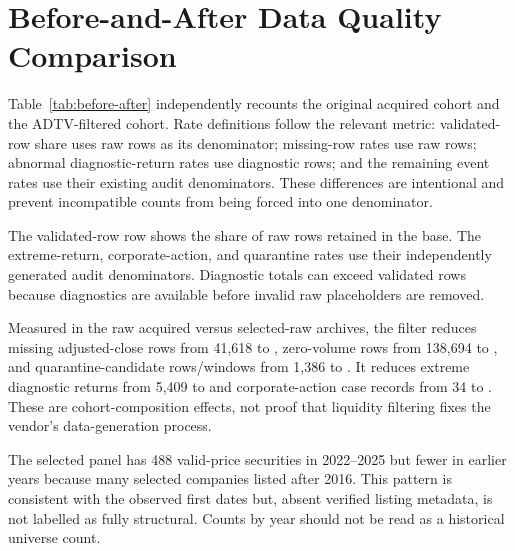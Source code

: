 \section{Before-and-After Data Quality Comparison}

Table~\ref{tab:before-after} independently recounts the original acquired
cohort and the ADTV-filtered cohort. Rate definitions follow the relevant
metric: validated-row share uses raw rows as its denominator; missing-row rates
use raw rows; abnormal diagnostic-return rates use diagnostic rows; and the
remaining event rates use their existing audit denominators. These differences
are intentional and prevent incompatible counts from being forced into one
denominator.

\begin{table}[H]
\centering
\caption{Before-and-after data-quality comparison}
\label{tab:before-after}
\scriptsize
{}
\begin{tablenotes}\small
\item The validated-row row shows the share of raw rows retained in the base.
The extreme-return, corporate-action, and quarantine rates use their
independently generated audit denominators. Diagnostic totals can exceed
validated rows because diagnostics are available before invalid raw
placeholders are removed.
\end{tablenotes}
\end{table}

Measured in the raw acquired versus selected-raw archives, the filter reduces
missing adjusted-close rows from 41,618 to \MissingAdjClose{}, zero-volume rows
from 138,694 to \ZeroVolumeRows{}, and
quarantine-candidate rows/windows from 1,386 to \QuarantineRowsWindows{}.
It reduces extreme diagnostic returns from 5,409 to \ExtremeReturns{} and
corporate-action case records from 34 to \CorporateActionCaseRecords{}.
These are cohort-composition effects, not proof that liquidity filtering fixes
the vendor's data-generation process.

\begin{table}[H]
\centering
\caption{Selected-cohort observations and missing values by year}
\label{tab:quality-year}
\small
{}
\end{table}

The selected panel has 488 valid-price securities in 2022--2025 but fewer in
earlier years because many selected companies listed after 2016. This pattern
is consistent with the observed first dates but, absent verified listing
metadata, is not labelled as fully structural. Counts by year should not be
read as a historical universe count.
